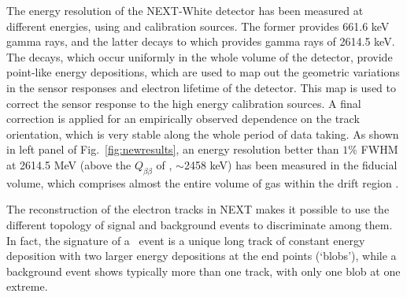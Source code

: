 The energy resolution of the NEXT-White detector has been measured at different energies, using  and  calibration sources. The former provides 661.6 keV gamma rays, and the latter decays to  which provides gamma rays of 2614.5 keV. The  decays, which occur uniformly in the whole volume of the detector, provide point-like energy depositions, which are used to map out the geometric variations in the sensor responses and electron lifetime of the detector. This map is used to correct the sensor response to the high energy calibration sources. A final correction is applied for an empirically observed dependence on the track orientation, which is very stable along the whole period of data taking. As shown in left panel of Fig.~\ref{fig:newresults}, an energy resolution better than $1\%$ FWHM at 2614.5 MeV (above the $Q_{\beta\beta}$ of , $\sim$2458 keV) has been measured in the fiducial volume, which comprises almost the entire volume of gas within the drift region \cite{Renner:2019pfe}.

\indent


The reconstruction of the electron tracks in NEXT makes it possible to use the different topology of signal and background events to discriminate among them. In fact, the signature of a \bbonu ~event is a unique long track of constant energy deposition with two larger energy depositions at the end points (‘blobs’), while a background event shows typically more than one track, with only one blob at one extreme. 

\indent


